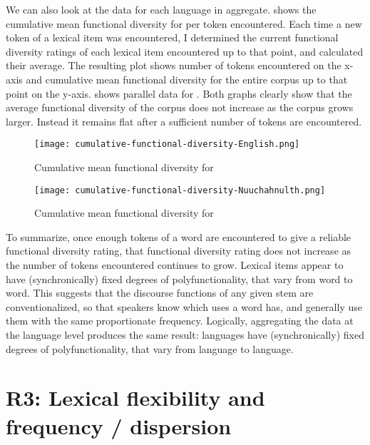 We can also look at the data for each language in aggregate.  shows the cumulative mean functional diversity for  per token encountered. Each time a new token of a lexical item was encountered, I determined the current functional diversity ratings of each lexical item encountered up to that point, and calculated their average. The resulting plot shows number of tokens encountered on the x-axis and cumulative mean functional diversity for the entire corpus up to that point on the y-axis.  shows parallel data for . Both graphs clearly show that the average functional diversity of the corpus does not increase as the corpus grows larger. Instead it remains flat after a sufficient number of tokens are encountered.

\begin{figure}[h!]
  \centering
  \caption{Cumulative mean functional diversity for }
  \label{fig:cumulative-functional-diversity-English}
  \texttt{[image: cumulative-functional-diversity-English.png]}
\end{figure}

\begin{figure}[h!]
  \centering
  \caption{Cumulative mean functional diversity for }
  \label{fig:cumulative-functional-diversity-Nuuchahnulth}
  \texttt{[image: cumulative-functional-diversity-Nuuchahnulth.png]}
\end{figure}

To summarize, once enough tokens of a word are encountered to give a reliable functional diversity rating, that functional diversity rating does not increase as the number of tokens encountered continues to grow. Lexical items appear to have (synchronically) fixed degrees of polyfunctionality, that vary from word to word. This suggests that the discourse functions of any given stem are conventionalized, so that speakers know which uses a word has, and generally use them with the same proportionate frequency. Logically, aggregating the data at the language level produces the same result: languages have (synchronically) fixed degrees of polyfunctionality, that vary from language to language.

\section{R3: Lexical flexibility and frequency / dispersion}
\label{sec:4.5}

